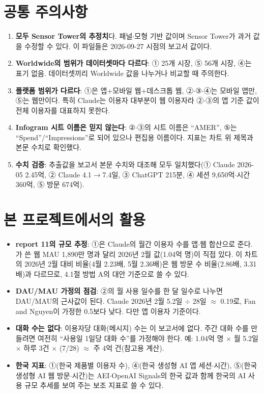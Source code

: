 \documentclass[11pt]{article}
\begin{document}
\section{공통 주의사항}

\begin{enumerate}[label=(\arabic*)]
  \item \textbf{모두 Sensor Tower의 추정치}다. 패널$\cdot$모형 기반 값이며 Sensor Tower가 과거 값을 수정할 수 있다. 이 파일들은 2026-09-27 시점의 보고서 값이다.
  \item \textbf{Worldwide의 범위가 데이터셋마다 다르다}: ① 25개 시장, ⑤ 56개 시장, ④는 표기 없음. 데이터셋끼리 Worldwide 값을 나누거나 비교할 때 주의한다.
  \item \textbf{플랫폼 범위가 다르다}: ①은 앱+모바일 웹+데스크톱 웹, ②$\cdot$③$\cdot$④는 모바일 앱만, ⑤는 웹만이다. 특히 Claude는 이용자 대부분이 웹 이용자라 ②$\cdot$③의 앱 기준 값이 전체 이용자를 대표하지 못한다.
  \item \textbf{Infogram 시트 이름은 믿지 않는다}: ②$\cdot$③의 시트 이름은 ``AMER'', ⑤는 ``Spend''/``Impressions''로 되어 있으나 편집용 이름이다. 지표는 차트 위 제목과 본문 수치로 확인했다.
  \item \textbf{수치 검증}: 추출값을 보고서 본문 수치와 대조해 모두 일치했다(① Claude 2026-05 2.45억, ② Claude 4.1$\to$7.4일, ③ ChatGPT 215분, ④ 세션 9,650억$\cdot$시간 360억, ⑤ 방문 674억).
\end{enumerate}

\section{본 프로젝트에서의 활용}

\begin{itemize}
  \item \textbf{report 11의 규모 추정}: ①은 Claude의 월간 이용자 수를 앱$\cdot$웹 합산으로 준다. \textcite{fan-2026-aggregate-gains-from-ai}가 쓴 웹 MAU 1,890만 명과 달리 2026년 2월 값(1.04억 명)이 직접 있다. 이 차트의 2026년 2월 대비 비율(4월 2.23배, 5월 2.36배)은 웹 방문 수 비율(2.86배, 3.31배)과 다르므로, 4.1절 방법 A의 대안 기준으로 쓸 수 있다.
  \item \textbf{DAU/MAU 가정의 점검}: ②의 월 사용 일수를 한 달 일수로 나누면 DAU/MAU의 근사값이 된다. Claude 2026년 2월 5.2일 $\div$ 28일 $\approx$ 0.19로, Fan and Nguyen이 가정한 0.5보다 낮다. 다만 앱 이용자 기준이다.
  \item \textbf{대화 수는 없다}: 이용자당 대화(메시지) 수는 이 보고서에 없다. 주간 대화 수를 만들려면 여전히 ``사용일 1일당 대화 수''를 가정해야 한다. 예: 1.04억 명 $\times$ 월 5.2일 $\times$ 하루 3건 $\times$ (7/28) $\approx$ 주 4억 건(참고용 계산).
  \item \textbf{한국 지표}: ①(한국 제품별 이용자 수), ④(한국 생성형 AI 앱 세션$\cdot$시간), ⑤(한국 생성형 AI 웹 방문$\cdot$시간)는 AEI$\cdot$OpenAI Signals의 한국 값과 함께 한국의 AI 사용 규모 추세를 보여 주는 보조 지표로 쓸 수 있다.
\end{itemize}
\end{document}
